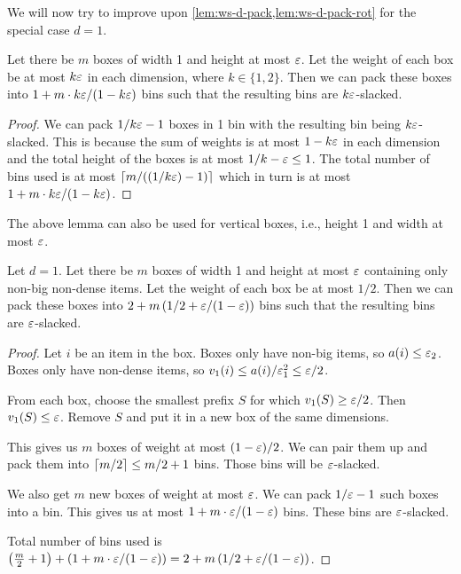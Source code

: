 We will now try to improve upon \cref{lem:ws-d-pack,lem:ws-d-pack-rot}
for the special case $d=1$.

\begin{lemma}
\label{lem:light-cont-pack}
Let there be $m$ boxes of width 1 and height at most $\varepsilon$.
Let the weight of each box be at most $k\varepsilon$ in each dimension, where $k \in \{1, 2\}$.
Then we can pack these boxes into $1 + m\cdot k\varepsilon/(1-k\varepsilon)$ bins such that
the resulting bins are $k\varepsilon$-slacked.
\end{lemma}
\begin{proof}
We can pack $1/k\varepsilon-1$ boxes in 1 bin with the resulting bin being $k\varepsilon$-slacked.
This is because the sum of weights is at most $1-k\varepsilon$ in each dimension
and the total height of the boxes is at most $1/k-\varepsilon \le 1$.
The total number of bins used is at most
$\left\lceil m/((1/k\varepsilon)-1) \right\rceil$ which in turn is at most $1 + m\cdot k\varepsilon/(1-k\varepsilon)$.
\end{proof}
The above lemma can also be used for vertical boxes, i.e., height 1 and width at most $\varepsilon$.

\begin{lemma}
\label{lem:non-dense-cont-pack}
Let $d=1$. Let there be $m$ boxes of width 1 and height at most $\varepsilon$
containing only non-big non-dense items. Let the weight of each box be at most $1/2$.
Then we can pack these boxes into
$2 + m\left(1/2 + \varepsilon/(1-\varepsilon)\right)$
bins such that the resulting bins are $\varepsilon$-slacked.
\end{lemma}
\begin{proof}
Let $i$ be an item in the box.
Boxes only have non-big items, so $a(i) \le \varepsilon_2$.
Boxes only have non-dense items,
so $v_1(i) \le a(i)/\varepsilon_1^2 \le \varepsilon/2$.

From each box, choose the smallest prefix $S$ for which $v_1(S) \ge \varepsilon/2$.
Then $v_1(S) \le \varepsilon$. Remove $S$ and put it in a new box of the same dimensions.

This gives us $m$ boxes of weight at most $(1-\varepsilon)/2$.
We can pair them up and pack them into $\left\lceil m/2 \right\rceil \le m/2 + 1$ bins.
Those bins will be $\varepsilon$-slacked.

We also get $m$ new boxes of weight at most $\varepsilon$.
We can pack $1/\varepsilon-1$ such boxes into a bin.
This gives us at most $1 + m\cdot\varepsilon/(1-\varepsilon)$ bins.
These bins are $\varepsilon$-slacked.

Total number of bins used is
 $\left(\frac{m}{2} + 1\right) + \left(1 + m\cdot\varepsilon/(1-\varepsilon)\right)
= 2 + m\left(1/2 + \varepsilon/(1-\varepsilon)\right)$.
\end{proof}

